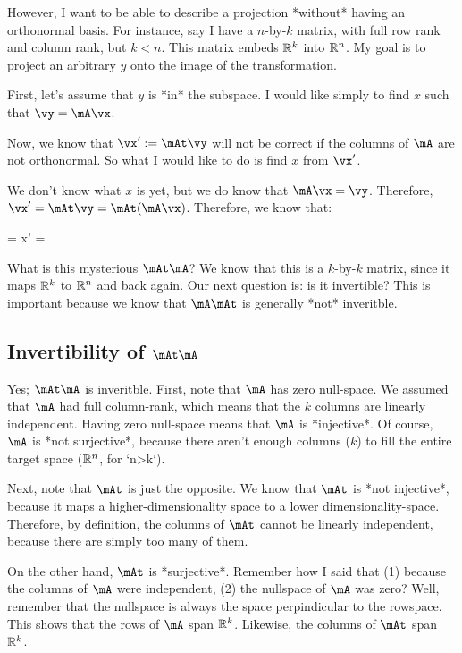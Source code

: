 However, I want to be able to describe a projection *without* having an
orthonormal basis. For instance, say I have a $n$-by-$k$ matrix, with
full row rank and column rank, but $k<n$. This matrix embeds $\mathbb{R}^k$ into
$\mathbb{R}^n$. My goal is to project an arbitrary $y$ onto the image of the
transformation.

First, let's assume that $y$ is *in* the subspace. I would like simply
to find $x$ such that $\vy = \mA\vx$.

Now, we know that $\vx' := \mAt \vy$ will not be correct if the columns
of $\mA$ are not orthonormal. So what I would like to do is find $x$
from $\vx'$.

We don't know what $x$ is yet, but we do know that $\mA\vx=\vy$.
Therefore, $\vx' = \mAt \vy = \mAt(\mA\vx)$. Therefore, we know that:

\begin{nedqn}
  \vx = \parensinv{\mAt\mA} x' = \parensinv{\mAt\mA} \parens{\mAt \vy}
\end{nedqn}

What is this mysterious $\mAt\mA$? We know that this is a $k$-by-$k$
matrix, since it maps $\mathbb{R}^k$ to $\mathbb{R}^n$ and back again. Our next question
is: is it invertible? This is important because we know that $\mA\mAt$
is generally *not* inveritble.

\subsection{Invertibility of \texorpdfstring{$\mAt\mA$}{AtA}}

Yes; $\mAt\mA$ is inveritble. First, note that $\mA$ has zero null-space.
We assumed that $\mA$ had full column-rank, which means that the $k$
columns are linearly independent. Having zero null-space means that $\mA$
is *injective*. Of course, $\mA$ is *not surjective*, because there aren't
enough columns ($k$) to fill the entire target space ($\mathbb{R}^n$, for `n>k`).

Next, note that $\mAt$ is just the opposite. We know that $\mAt$
is *not injective*, because it maps a higher-dimensionality space to a
lower dimensionality-space. Therefore, by definition, the columns of
$\mAt$ cannot be linearly independent, because there are simply too
many of them.

On the other hand, $\mAt$ is *surjective*. Remember how I said that
(1) because the columns of $\mA$ were independent, (2) the nullspace of
$\mA$ was zero? Well, remember that the nullspace is always the space
perpindicular to the rowspace. This shows that the rows of $\mA$ span
$\mathbb{R}^k$. Likewise, the columns of $\mAt$ span $\mathbb{R}^k$.

